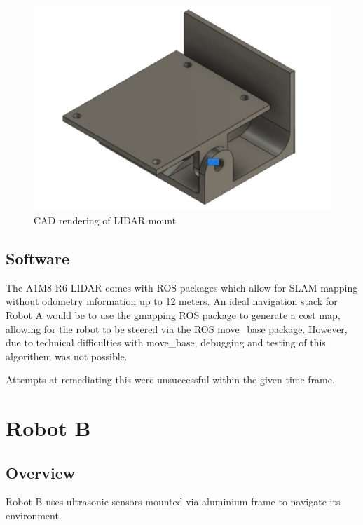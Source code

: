 \documentclass[11pt]{article}
\begin{document}
	\begin{figure}[h!]
		\centering
		\includegraphics[scale=0.6]{lidar_mount}
		\caption{CAD rendering of LIDAR mount}
	\end{figure}
	
	\subsection{Software}
	The A1M8-R6 LIDAR comes with ROS packages which allow for SLAM mapping without odometry information up to 12 meters. An ideal navigation stack for Robot A would be to use the gmapping ROS package to generate a cost map, allowing for the robot to be steered via the ROS move\_base package. However, due to technical difficulties with move\_base, debugging and testing of this algorithem was not possible. \newline
	
	Attempts at remediating this were unsuccessful within the given time frame.
	
	\pagebreak

	\section{Robot B}
	
	\subsection{Overview}
	Robot B uses ultrasonic sensors mounted via aluminium frame to navigate its environment.
	
\end{document}
